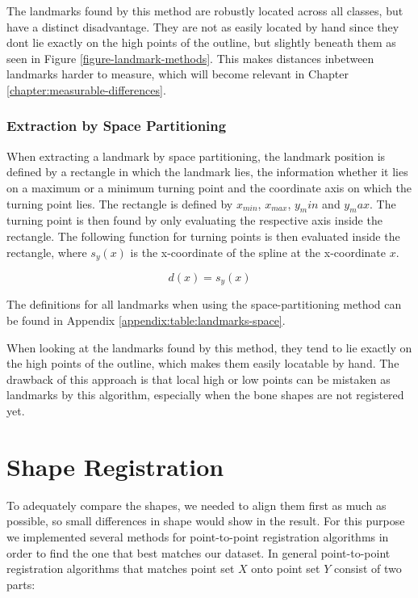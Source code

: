 \documentclass[pdftex,12pt,a4paper]{report}
\begin{document}
The landmarks found by this method are robustly located across all classes, but have a distinct disadvantage. They are
not as easily located by hand since they dont lie exactly on the high points of the outline, but slightly beneath
them  as seen in Figure \ref{figure-landmark-methods}. This makes distances inbetween landmarks harder to measure, which
will become relevant in Chapter \ref{chapter:measurable-differences}.

\subsubsection{Extraction by Space Partitioning}

When extracting a landmark by space partitioning, the landmark position is defined by a rectangle in which the landmark
lies, the information whether it lies on a maximum or a minimum turning point and the coordinate axis on which the
turning point lies. The rectangle is defined by $x_{min}$, $x_{max}$, $y_min$ and $y_max$. The turning point
is then found by only evaluating the respective axis inside the rectangle. The following function for turning points
is then evaluated inside the rectangle, where $s_y(x)$ is the x-coordinate of the spline at the x-coordinate $x$.

\begin{equation}
d(x) = s_y(x)
\end{equation}

The definitions for all landmarks when using the space-partitioning method can be found in Appendix
\ref{appendix:table:landmarks-space}.

When looking at the landmarks found by this method, they tend to lie exactly on the high points of the outline, which
makes them easily locatable by hand. The drawback of this approach is that local high or low points can be mistaken as
landmarks by this algorithm, especially when the bone shapes are not registered yet.

\section{Shape Registration}

To adequately compare the shapes, we needed to align them first as much as possible, so small differences in shape would
show in the result. For this purpose we implemented several methods for point-to-point registration algorithms in order
to find the one that best matches our dataset. In general point-to-point registration algorithms that matches point set
$X$ onto point set $Y$ consist of two parts:
\end{document}
